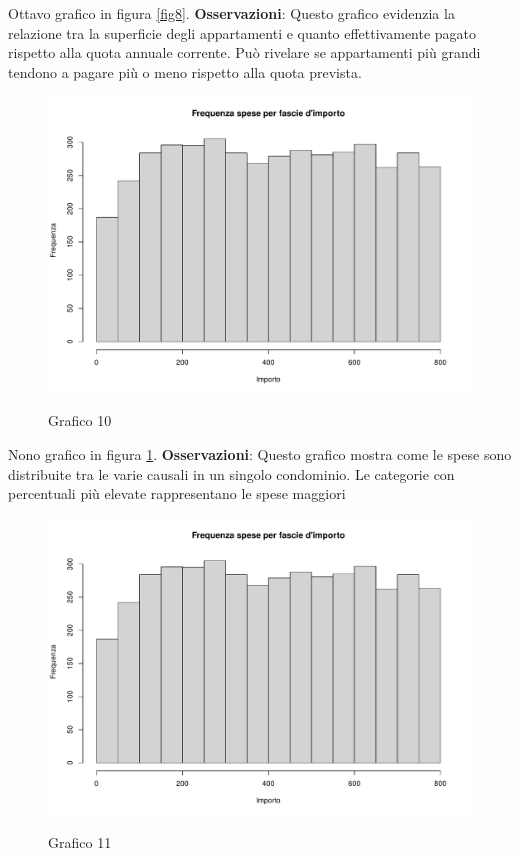 Ottavo grafico in figura \ref{fig8}. \textbf{Osservazioni}: Questo grafico evidenzia la relazione tra la superficie degli appartamenti e quanto effettivamente pagato rispetto alla quota annuale corrente. Può rivelare se appartamenti più grandi tendono a pagare più o meno rispetto alla quota prevista.

\clearpage

\begin{figure}[t]
	\caption{Grafico 10}
	\includegraphics[page=10,width=\textwidth]{../R/grafici.pdf}
	\label{fig10}
\end{figure}

Nono grafico in figura \ref{fig10}. \textbf{Osservazioni}: Questo grafico mostra come le spese sono distribuite tra le varie causali in un singolo condominio. Le categorie con percentuali più elevate rappresentano le spese maggiori


\clearpage

\begin{figure}[t]
	\caption{Grafico 11}
	\includegraphics[page=11,width=\textwidth]{../R/grafici.pdf}
	\label{fig11}
\end{figure}

